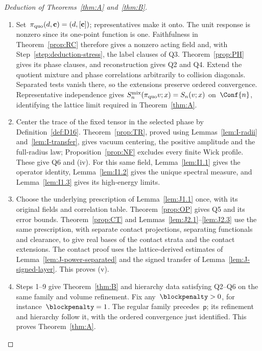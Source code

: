 \begin{proof}[Deduction of Theorems~\ref{thm:A} and~\ref{thm:B}]
\begin{enumerate}[label=\textup{\arabic*.},ref=\arabic*,itemsep=0.25em]
\item\label{step:deduction-hierarchy} Set~$\pi_{\rm quo}(d,\mathbf c)=(d,[\mathbf c])$; representatives make it onto. The unit response is nonzero since its one-point function is one. Faithfulness in Theorem~\ref{prop:RC} therefore gives a nonzero acting field and, with Step~\ref{step:deduction-stress}, the label clauses of Q3. Theorem~\ref{prop:PH} gives its phase clauses, and reconstruction gives Q2 and Q4. Extend the quotient mixture and phase correlations arbitrarily to collision diagonals. Separated tests vanish there, so the extensions preserve ordered convergence. Representative independence gives $S_n^{\rm mix}(\pi_{\rm quo}v;x)=S_n(v;x)$ on~$\Conf{n}$, identifying the lattice limit required in Theorem~\ref{thm:A}.

\item\label{step:deduction-trace} Center the trace of the fixed tensor in the selected phase by Definition~\ref{def:D16}. Theorem~\ref{prop:TR}, proved using Lemmas~\ref{lem:I-radii} and~\ref{lem:I-transfer}, gives vacuum centering, the positive amplitude and the full-radius law; Proposition~\ref{prop:NF} excludes every finite Wick profile. These give Q6 and (iv). For this same field, Lemma~\ref{lem:I1.1} gives the operator identity, Lemma~\ref{lem:I1.2} gives the unique spectral measure, and Lemma~\ref{lem:I1.3} gives its high-energy limits.

\item\label{step:deduction-products} Choose the underlying prescription of Lemma~\ref{lem:J1.1} once, with its original fields and correlation table. Theorem~\ref{prop:OP} gives Q5 and its error bounds. Theorem~\ref{prop:CT} and Lemmas~\ref{lem:J2.1}--\ref{lem:J2.3} use the same prescription, with separate contact projections, separating functionals and clearance, to give real bases of the contact strata and the contact extensions. The contact proof uses the lattice-derived estimates of Lemma~\ref{lem:J-power-separated} and the signed transfer of Lemma~\ref{lem:J-signed-layer}. This proves (v).

\item\label{step:deduction-conclusion} Steps 1--9 give Theorem~\ref{thm:B} and hierarchy data satisfying Q2--Q6 on the same family and volume refinement. Fix any~$\blockpenalty>0$, for instance~$\blockpenalty=1$. The regular family precedes~$\mathsf p$; its refinement and hierarchy follow it, with the ordered convergence just identified. This proves Theorem~\ref{thm:A}.\qedhere
\end{enumerate}
\end{proof}

